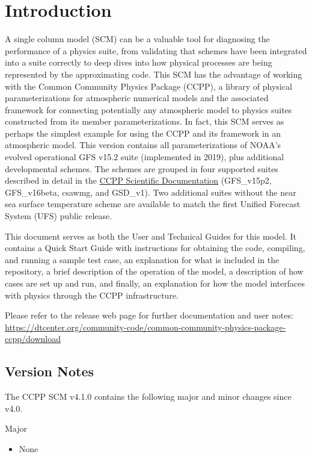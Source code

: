 \chapter{Introduction}
\label{chapter: introduction}

A single column model (SCM) can be a valuable tool for diagnosing the performance of a physics suite, from validating that schemes have been integrated into a suite correctly to deep dives into how physical processes are being represented by the approximating code. This SCM has the advantage of working with the Common Community Physics Package (CCPP), a library of physical parameterizations for atmospheric numerical models and the associated framework for connecting potentially any atmospheric model to physics suites constructed from its member parameterizations. In fact, this SCM serves as perhaps the simplest example for using the CCPP and its framework in an atmospheric model. This version contains all parameterizations of NOAA's evolved operational GFS v15.2 suite (implemented in 2019), plus additional developmental schemes. The schemes are grouped in four supported suites described in detail in the \href{https://dtcenter.org/GMTB/v4.0/sci\_doc/}{CCPP Scientific Documentation} (GFS\_v15p2, GFS\_v16beta, csawmg, and GSD\_v1). Two additional suites without the near sea surface temperature scheme are available to match the first Unified Forecast System (UFS) public release.

This document serves as both the User and Technical Guides for this model. It contains a Quick Start Guide with instructions for obtaining the code, compiling, and running a sample test case, an explanation for what is included in the repository, a brief description of the operation of the model, a description of how cases are set up and run, and finally, an explanation for how the model interfaces with physics through the CCPP infrastructure.

Please refer to the release web page for further documentation and user notes:\\ \url{https://dtcenter.org/community-code/common-community-physics-package-ccpp/download}

\section{Version Notes}

The CCPP SCM v4.1.0 contains the following major and minor changes since v4.0.

Major
\begin{itemize}
\item None
\end{itemize}

